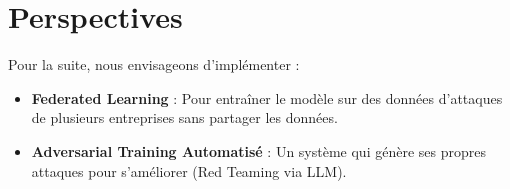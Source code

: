 \documentclass[a4paper,12pt]{report}
\begin{document}
\section{Perspectives}
Pour la suite, nous envisageons d'implémenter :
\begin{itemize}
    \item \textbf{Federated Learning} : Pour entraîner le modèle sur des données d'attaques de plusieurs entreprises sans partager les données.
    \item \textbf{Adversarial Training Automatisé} : Un système qui génère ses propres attaques pour s'améliorer (Red Teaming via LLM).
\end{itemize}
\end{document}
